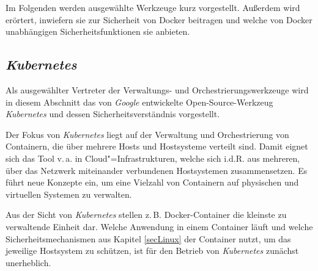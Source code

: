 \documentclass[../main.tex]{subfiles}
\begin{document}
    Im Folgenden werden ausgewählte Werkzeuge kurz vorgestellt. Außerdem wird erörtert, inwiefern sie zur Sicherheit von Docker beitragen und welche von Docker unabhängigen Sicherheitsfunktionen sie anbieten.



    \subsection{\emph{Kubernetes}}
      Als ausgewählter Vertreter der Verwaltungs- und Orchestrierungswerkzeuge wird in diesem Abschnitt das von \emph{Google} entwickelte Open-Source-Werkzeug \emph{Kubernetes} und dessen Sicherheitsverständnis vorgestellt.

      Der Fokus von \emph{Kubernetes} liegt auf der Verwaltung und Orchestrierung von Containern, die über mehrere Hosts und Hostsysteme verteilt sind. Damit eignet sich das Tool v.\,a. in Cloud"=Infrastrukturen, welche sich i.d.R. aus mehreren, über das Netzwerk miteinander verbundenen Hostsystemen zusammensetzen. Es führt neue Konzepte ein, um eine Vielzahl von Containern auf physischen und virtuellen Systemen zu verwalten.


      Aus der Sicht von \emph{Kubernetes} stellen z.\,B. Docker-Container die kleinste zu verwaltende Einheit dar. Welche Anwendung in einem Container läuft und welche Sicherheitsmechanismen aus Kapitel \ref{secLinux} der Container nutzt, um das jeweilige Hostsystem zu schützen, ist für den Betrieb von \emph{Kubernetes} zunächst unerheblich.
\end{document}
